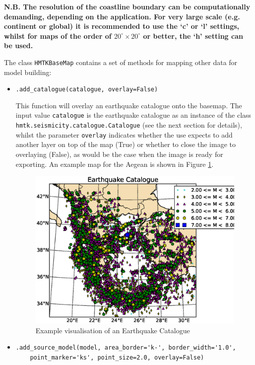 \noindent \textbf{N.B. The resolution of the coastline boundary can be computationally demanding, depending on the application. For very large scale (e.g. continent or global) it is recommended to use the `c' or `l' settings, whilst for maps of the order of $20^{\circ} \times 20^{\circ}$ or better, the `h' setting can be used.} 

The class \verb=HMTKBaseMap= contains a set of methods for mapping other data for model building:
\begin{itemize}
\item \verb;.add_catalogue(catalogue, overlay=False);

This function will overlay an earthquake catalogue onto the basemap. The input value \verb=catalogue= is the earthquake catalogue as an instance of the class \\\verb=hmtk.seismicity.catalogue.Catalogue= (see the next section for details), whilst the parameter \verb=overlay= indicates whether the use expects to add another layer on top of the map (True) or whether to close the image to overlaying (False), as would be the case when the image is ready for exporting. An example map for the Aegean is shown in Figure \ref{fig:eqcat_simple}.
   
\begin{figure}[htb]
  \centering
      \includegraphics[trim=20mm 14mm 1mm 1mm, clip, width=\textwidth]{./figures/EQCatalogueSimple.eps}
  \caption{Example visualisation of an Earthquake Catalogue}
  \label{fig:eqcat_simple}
\end{figure}

\item \verb;.add_source_model(model, area_border='k-', border_width='1.0',;\\
    \verb;    point_marker='ks', point_size=2.0, overlay=False);


\end{itemize}

